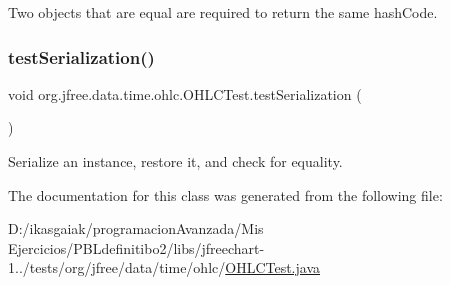 Two objects that are equal are required to return the same hash\+Code. \mbox{\label{classorg_1_1jfree_1_1data_1_1time_1_1ohlc_1_1_o_h_l_c_test_a73d2fc8987890443b1c7001639463cee}} 
\subsubsection{\texorpdfstring{test\+Serialization()}{testSerialization()}}
{\footnotesize\ttfamily void org.\+jfree.\+data.\+time.\+ohlc.\+O\+H\+L\+C\+Test.\+test\+Serialization (\begin{DoxyParamCaption}{ }\end{DoxyParamCaption})}

Serialize an instance, restore it, and check for equality. 

The documentation for this class was generated from the following file\+:\begin{DoxyCompactItemize}
\item 
D\+:/ikasgaiak/programacion\+Avanzada/\+Mis Ejercicios/\+P\+B\+Ldefinitibo2/libs/jfreechart-\/1../tests/org/jfree/data/time/ohlc/\mbox{\hyperlink{_o_h_l_c_test_8java}{O\+H\+L\+C\+Test.\+java}}\end{DoxyCompactItemize}
